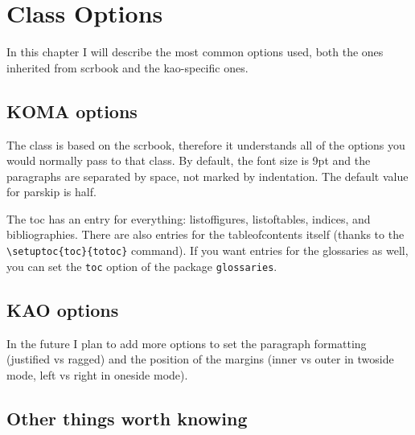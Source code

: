 \setchapterpreamble[u]{\margintoc}
\chapter{Class Options}

In this chapter I will describe the most common options used, both the 
ones inherited from scrbook and the kao-specific ones.

\section{KOMA options}

The class is based on the scrbook, therefore it understands all of the 
options you would normally pass to that class. By default, the font size 
is 9pt and the paragraphs are separated by space, not marked by 
indentation. The default value for parskip is half.

The toc has an entry for everything: listoffigures, listoftables, 
indices, and bibliographies. There are also entries for the 
tableofcontents itself (thanks to the \verb|\setuptoc{toc}{totoc}| 
command). If you want entries for the glossaries as well, you can set 
the \verb|toc| option of the package 
\verb|glossaries|.

\section{KAO options}

In the future I plan to add more options to set the paragraph formatting 
(justified vs ragged) and the position of the margins (inner vs outer in 
twoside mode, left vs right in oneside mode). 

\section{Other things worth knowing}

